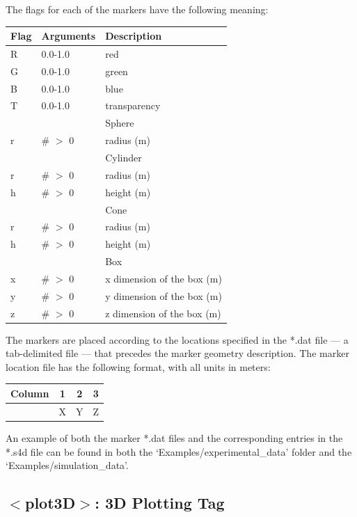 \documentclass[singlecolumn,12pt]{article}
\begin{document}
The flags for each of the markers have the following meaning:


\vspace{1cm}
\begin{tabular}{l l l}
\hline Flag & Arguments  & Description \\
\hline R & 0.0-1.0 & red\\
G & 0.0-1.0 & green\\
B & 0.0-1.0 & blue\\
T & 0.0-1.0 & transparency\\
\hline & & Sphere \\
r & \# $>$ 0 & radius (m) \\
\hline & & Cylinder \\
r & \# $>$ 0 & radius (m) \\
h & \# $>$ 0 & height (m) \\
\hline & & Cone \\
r & \# $>$ 0 & radius (m) \\
h & \# $>$ 0 & height (m) \\
\hline & & Box \\
x & \# $>$ 0 & x dimension of the box (m) \\
y & \# $>$ 0 & y dimension of the box (m) \\
z & \# $>$ 0 & z dimension of the box (m) \\
\end{tabular}
\vspace{1cm}

The markers are placed according to the locations specified in the
*.dat file --- a tab-delimited file --- that precedes the marker
geometry description. The marker location file has the following
format, with all units in meters:


\vspace{1cm}
\begin{center}
\begin{tabular}{c|c|c|c}
\hline Column & 1 & 2 & 3\\
\hline & X & Y  & Z \\
\end{tabular}
\end{center}
\vspace{1cm}

An example of both the marker *.dat files and the corresponding
entries in the *.s4d file can be found in both the
`Examples/experimental\_data' folder and the
`Examples/simulation\_data'.

\subsection{$<$plot3D$>$: 3D Plotting Tag}
\end{document}
